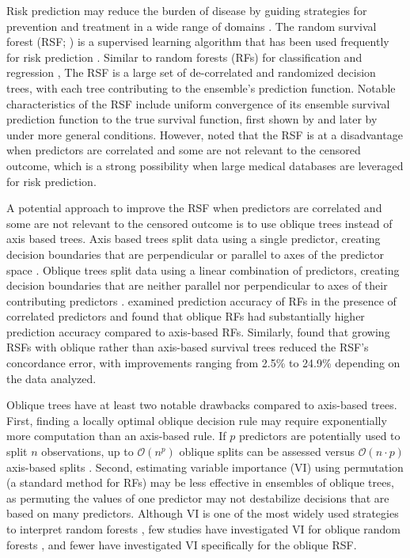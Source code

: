 \documentclass[twoside,11pt]{article}\usepackage[]{graphicx}\usepackage[]{xcolor}
\begin{document}
Risk prediction may reduce the burden of disease by guiding strategies for prevention and treatment in a wide range of domains \citep{moons2012riskII, moons2012riskI}. The random survival forest (RSF; \citet{ishwaran2008random, hothorn2006unbiased}) is a supervised learning algorithm that has been used frequently for risk prediction \citep{wang2017selective}. Similar to random forests (RFs) for classification and regression \citep{breiman2001random}, The RSF is a large set of de-correlated and randomized decision trees, with each tree contributing to the ensemble's prediction function. Notable characteristics of the RSF include uniform convergence of its ensemble survival prediction function to the true survival function, first shown by \citet{ishwaran2010consistency} and later by \citet{cui2017consistency} under more general conditions. However, \citet{cui2017consistency} noted that the RSF is at a disadvantage when predictors are correlated and some are not relevant to the censored outcome, which is a strong possibility when large medical databases are leveraged for risk prediction.

A potential approach to improve the RSF when predictors are correlated and some are not relevant to the censored outcome is to use oblique trees instead of axis based trees. Axis based trees split data using a single predictor, creating decision boundaries that are perpendicular or parallel to axes of the predictor space \citep[see][Chapter~2]{breiman2017classification}. Oblique trees split data using a linear combination of predictors, creating decision boundaries that are neither parallel nor perpendicular to axes of their contributing predictors \citep[see][Chapter~5]{breiman2017classification}. \citet{menze2011oblique} examined prediction accuracy of RFs in the presence of correlated predictors and found that oblique RFs had substantially higher prediction accuracy compared to axis-based RFs. Similarly, \citet{jaeger2019oblique} found that growing RSFs with oblique rather than axis-based survival trees reduced the RSF's concordance error, with improvements ranging from 2.5\% to 24.9\% depending on the data analyzed.

Oblique trees have at least two notable drawbacks compared to axis-based trees. First, finding a locally optimal oblique decision rule may require exponentially more computation than an axis-based rule. If $p$ predictors are potentially used to split $n$ observations, up to $\mathcal{O}(n^p)$ oblique splits can be assessed versus $\mathcal{O}(n \cdot p)$ axis-based splits \citep{heath1993induction, murthy1994system}. Second, estimating variable importance (VI) using permutation (a standard method for RFs) may be less effective in ensembles of oblique trees, as permuting the values of one predictor may not destabilize decisions that are based on many predictors. Although VI is one of the most widely used strategies to interpret random forests \citep{ishwaran2019standard}, few studies have investigated VI for oblique random forests \citep[see][Section~5]{menze2011oblique}, and fewer have investigated VI specifically for the oblique RSF.
\end{document}

